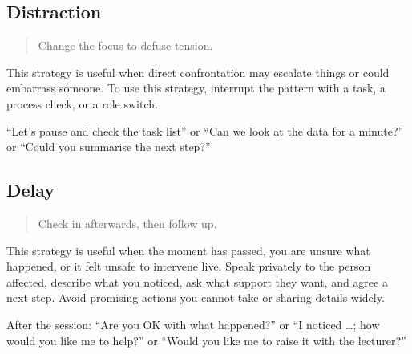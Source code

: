 \documentclass[
  a4paper,
  DIV=11,
  numbers=noendperiod,
  oneside]{scrreprt}
\begin{document}
\subsection{Distraction}\label{distraction}

\begin{quote}
Change the focus to defuse tension.
\end{quote}

This strategy is useful when direct confrontation may escalate things or
could embarrass someone. To use this strategy, interrupt the pattern
with a task, a process check, or a role switch.

\begin{tcolorbox}[enhanced jigsaw, colframe=quarto-callout-note-color-frame, title=\textcolor{quarto-callout-note-color}{\faInfo}\hspace{0.5em}{Example phrases}, breakable, opacityback=0, titlerule=0mm, colbacktitle=quarto-callout-note-color!10!white, toptitle=1mm, colback=white, coltitle=black, toprule=.15mm, bottomtitle=1mm, left=2mm, arc=.35mm, rightrule=.15mm, bottomrule=.15mm, opacitybacktitle=0.6, leftrule=.75mm]

``Let's pause and check the task list'' or ``Can we look at the data for
a minute?'' or ``Could you summarise the next step?''

\end{tcolorbox}

\subsection{Delay}\label{delay}

\begin{quote}
Check in afterwards, then follow up.
\end{quote}

This strategy is useful when the moment has passed, you are unsure what
happened, or it felt unsafe to intervene live. Speak privately to the
person affected, describe what you noticed, ask what support they want,
and agree a next step. Avoid promising actions you cannot take or
sharing details widely.

\begin{tcolorbox}[enhanced jigsaw, colframe=quarto-callout-note-color-frame, title=\textcolor{quarto-callout-note-color}{\faInfo}\hspace{0.5em}{Example phrases}, breakable, opacityback=0, titlerule=0mm, colbacktitle=quarto-callout-note-color!10!white, toptitle=1mm, colback=white, coltitle=black, toprule=.15mm, bottomtitle=1mm, left=2mm, arc=.35mm, rightrule=.15mm, bottomrule=.15mm, opacitybacktitle=0.6, leftrule=.75mm]

After the session: ``Are you OK with what happened?'' or ``I noticed
\ldots; how would you like me to help?'' or ``Would you like me to raise
it with the lecturer?''

\end{tcolorbox}
\end{document}
